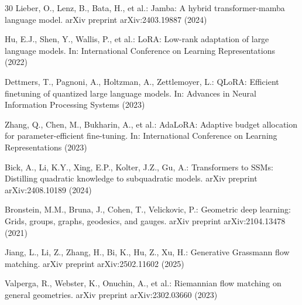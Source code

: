 \documentclass[conference]{IEEEtran}
\begin{document}
\begin{thebibliography}{30}
Lieber, O., Lenz, B., Bata, H., et al.: Jamba: A hybrid
transformer-mamba language model. arXiv preprint arXiv:2403.19887 (2024)

Hu, E.J., Shen, Y., Wallis, P., et al.: LoRA: Low-rank adaptation of
large language models. In: International Conference on Learning
Representations (2022)

Dettmers, T., Pagnoni, A., Holtzman, A., Zettlemoyer, L.: QLoRA:
Efficient finetuning of quantized large language models.
In: Advances in Neural Information Processing Systems (2023)

Zhang, Q., Chen, M., Bukharin, A., et al.: AdaLoRA: Adaptive budget
allocation for parameter-efficient fine-tuning.
In: International Conference on Learning Representations (2023)

Bick, A., Li, K.Y., Xing, E.P., Kolter, J.Z., Gu, A.: Transformers to
SSMs: Distilling quadratic knowledge to subquadratic models.
arXiv preprint arXiv:2408.10189 (2024)

Bronstein, M.M., Bruna, J., Cohen, T., Velickovic, P.: Geometric deep
learning: Grids, groups, graphs, geodesics, and gauges.
arXiv preprint arXiv:2104.13478 (2021)

Jiang, L., Li, Z., Zhang, H., Bi, K., Hu, Z., Xu, H.: Generative
Grassmann flow matching. arXiv preprint arXiv:2502.11602 (2025)

Valperga, R., Webster, K., Onuchin, A., et al.: Riemannian flow matching
on general geometries. arXiv preprint arXiv:2302.03660 (2023)

\end{thebibliography}
\end{document}
